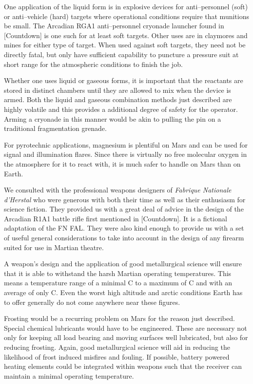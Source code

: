 One application of the liquid form is in explosive devices for anti--personnel (soft) or anti--vehicle (hard) targets where operational conditions require that munitions be small. The Arcadian RGA1 anti--personnel cryonade launcher found in [Countdown] is one such for at least soft targets. Other uses are in claymores and mines for either type of target. When used against soft targets, they need not be directly fatal, but only have sufficient capability to puncture a pressure suit at short range for the atmospheric conditions to finish the job.

Whether one uses liquid or gaseous forms, it is important that the reactants are stored in distinct chambers until they are allowed to mix when the device is armed. Both the liquid and gaseous combination methods just described are highly volatile and this provides a additional degree of safety for the operator. Arming a cryonade in this manner would be akin to pulling the pin on a traditional fragmentation grenade.

For pyrotechnic applications, magnesium is plentiful on Mars and can be used for signal and illumination flares. Since there is virtually no free molecular oxygen in the atmosphere for it to react with, it is much safer to handle on Mars than on Earth.


We consulted with the professional weapons designers of {\it Fabrique Nationale d'Herstal} who were generous with both their time as well as their enthusiasm for science fiction. They provided us with a great deal of advice in the design of the Arcadian R1A1 battle rifle first mentioned in [Countdown]. It is a fictional adaptation of the FN FAL. They were also kind enough to provide us with a set of useful general considerations to take into account in the design of any firearm suited for use in Martian theatre.

A weapon's design and the application of good metallurgical science will ensure that it is able to withstand the harsh Martian operating temperatures. This means a temperature range of a minimal C to a maximum of C and with an average of only C. Even the worst high altitude and arctic conditions Earth has to offer generally do not come anywhere near these figures. 

Frosting would be a recurring problem on Mars for the reason just described. Special chemical lubricants would have to be engineered. These are necessary not only for keeping all load bearing and moving surfaces well lubricated, but also for reducing frosting. Again, good metallurgical science will aid in reducing the likelihood of frost induced misfires and fouling. If possible, battery powered heating elements could be integrated within weapons such that the receiver can maintain a minimal operating temperature.

